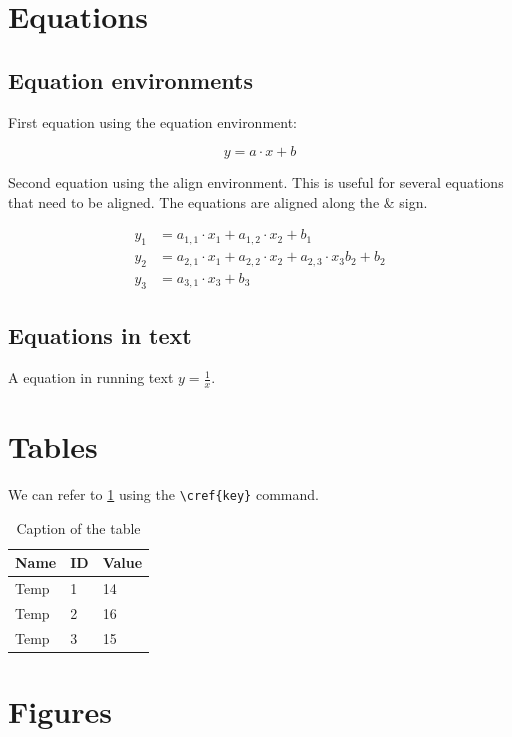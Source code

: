 \documentclass{article}
\begin{document}
\section{Equations}

\subsection{Equation environments}
First equation using the equation environment:

\begin{equation}
y = a \cdot x + b
\end{equation}

Second equation using the align environment. This is useful for several equations that need to be aligned. The equations are aligned along the \& sign.

\begin{align}
y_1 &= a_{1,1} \cdot x_1 + a_{1,2} \cdot x_2 + b_1 \\
y_2 &= a_{2,1} \cdot x_1 + a_{2,2} \cdot x_2 + a_{2,3} \cdot x_3 b_2 + b_2 \\
y_3 &= a_{3,1} \cdot x_3 + b_3
\end{align}

\subsection{Equations in text}

A equation in running text $y = \frac{1}{x}$.

\section{Tables}

We can refer to \cref{tab:my_label} using the \texttt{\textbackslash{}cref\{key\}} command.

\begin{table}[b]
    \centering
    \caption[First table]{Caption of the table}
    \label{tab:my_label}
    \begin{tabular}{lll}\hline
        Name & ID & Value\\\hline
         Temp & 1  & 14  \\
         Temp & 2  & 16 \\
         Temp & 3 & 15 \\ \hline
    \end{tabular}
\end{table}

\section{Figures}
\end{document}
